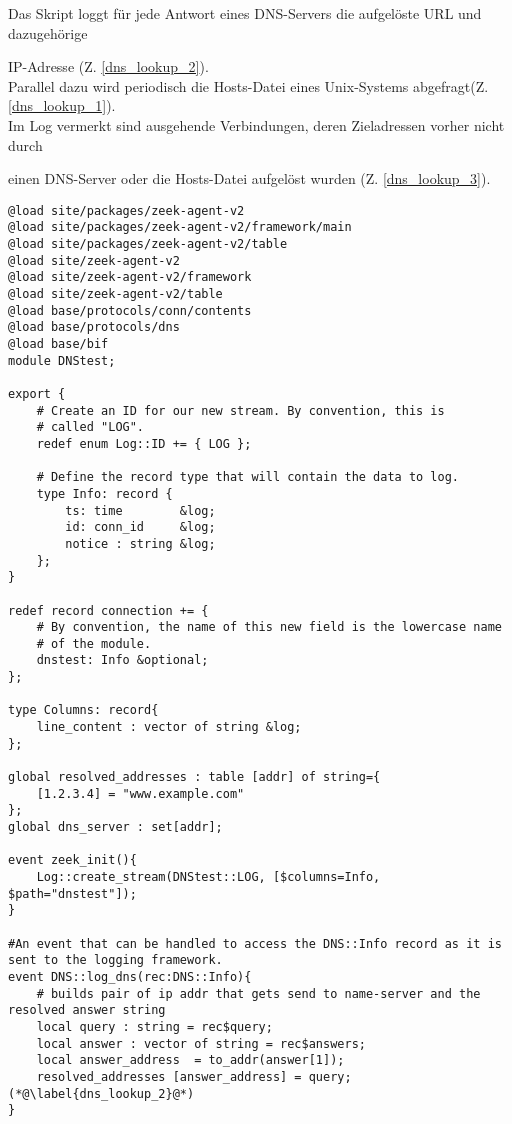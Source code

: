 Das Skript loggt für jede Antwort eines DNS-Servers die aufgelöste URL und dazugehörige 

IP-Adresse (Z. \ref{dns_lookup_2}).\\

Parallel dazu wird periodisch die Hosts-Datei eines Unix-Systems abgefragt(Z. \ref{dns_lookup_1}).\\

Im Log vermerkt sind ausgehende Verbindungen, deren Zieladressen vorher nicht durch 

einen DNS-Server oder die Hosts-Datei aufgelöst wurden (Z. \ref{dns_lookup_3}).

\begin{lstlisting}[firstnumber=45,consecutivenumbers=false,label={Code_5},linerange={45-45,47-52,58-59,61-64,65-73},caption={Überprüfung der Verbindungsziele eines Endgerätes},numberblanklines=false]
@load site/packages/zeek-agent-v2
@load site/packages/zeek-agent-v2/framework/main
@load site/packages/zeek-agent-v2/table
@load site/zeek-agent-v2
@load site/zeek-agent-v2/framework
@load site/zeek-agent-v2/table
@load base/protocols/conn/contents
@load base/protocols/dns
@load base/bif
module DNStest;

export {
    # Create an ID for our new stream. By convention, this is
    # called "LOG".
    redef enum Log::ID += { LOG };

    # Define the record type that will contain the data to log.
    type Info: record {
        ts: time        &log;
        id: conn_id     &log; 
        notice : string &log;
    };
}   

redef record connection += {
    # By convention, the name of this new field is the lowercase name
    # of the module.
    dnstest: Info &optional;
};

type Columns: record{
    line_content : vector of string &log;
};

global resolved_addresses : table [addr] of string={
    [1.2.3.4] = "www.example.com"
};
global dns_server : set[addr];

event zeek_init(){
    Log::create_stream(DNStest::LOG, [$columns=Info, $path="dnstest"]);
}

#An event that can be handled to access the DNS::Info record as it is sent to the logging framework.
event DNS::log_dns(rec:DNS::Info){
    # builds pair of ip addr that gets send to name-server and the resolved answer string
    local query : string = rec$query;
    local answer : vector of string = rec$answers;
    local answer_address  = to_addr(answer[1]);
    resolved_addresses [answer_address] = query; (*@\label{dns_lookup_2}@*)
}


\end{lstlisting}
